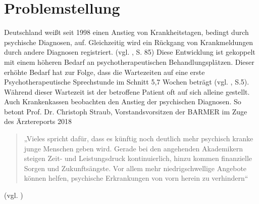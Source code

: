 
\section{Problemstellung}
\label{ch:Problemstellung}


Deutschland weißt seit 1998 einen Anstieg von Krankheitstagen, bedingt durch psychische Diagnosen, auf. Gleichzeitig wird ein Rückgang von Krankmeldungen durch andere Diagnosen registriert. (vgl. \cite{Jacobi2014}, S. 85) Diese Entwicklung ist gekoppelt mit einem höheren Bedarf an psychotherapeutischen Behandlungsplätzen. 
Dieser erhöhte Bedarf hat zur Folge, dass die Wartezeiten auf eine erste Psychotherapeutische Sprechstunde im Schnitt 5,7 Wochen beträgt (vgl. \cite{Microsof77:online}, S.5). Während dieser Wartezeit ist der betroffene Patient oft auf sich alleine gestellt. Auch Krankenkassen beobachten den Anstieg der psychischen Diagnosen. So betont Prof. Dr. Christoph Straub, Vorstandsvorsitzen der BARMER im Zuge des Ärztereports 2018 
\begin{quote}
„Vieles spricht dafür, dass es künftig noch deutlich mehr psychisch kranke junge Menschen geben wird. Gerade bei den angehenden Akademikern steigen Zeit- und Leistungsdruck kontinuierlich, hinzu kommen finanzielle Sorgen und Zukunftsängste. Vor allem mehr niedrigschwellige Angebote können helfen, psychische Erkrankungen von vorn herein zu verhindern“
\end{quote}
(vgl. \cite{Arztrepo90:online})
